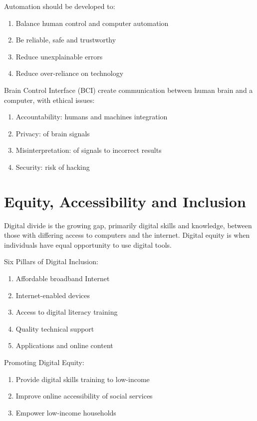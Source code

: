 \documentclass[12pt, a4paper]{article}
\begin{document}
\begin{multicols*}{3}
Automation should be developed to:
\begin{enumerate}[\roman*.]
  \item Balance human control and computer automation 
  \item Be reliable, safe and trustworthy
  \item Reduce unexplainable errors
  \item Reduce over-reliance on technology
\end{enumerate}

Brain Control Interface (BCI) create communication between human brain and a computer, with ethical issues:
\begin{enumerate}[\roman*.]
  \item Accountability: humans and machines integration
  \item Privacy: of brain signals
  \item Misinterpretation: of signals to incorrect results
  \item Security: risk of hacking
\end{enumerate}
\vspace{-0.5em}
\section{Equity, Accessibility and Inclusion}
Digital divide is the growing gap, primarily digital skills and knowledge, between those with differing access to computers and the internet. Digital equity is when individuals have equal opportunity to use digital tools.

Six Pillars of Digital Inclusion:
\begin{enumerate}[\roman*.]
  \item Affordable broadband Internet 
  \item Internet-enabled devices
  \item Access to digital literacy training
  \item Quality technical support 
  \item Applications and online content
\end{enumerate}

Promoting Digital Equity:
\begin{enumerate}[\roman*.]
  \item Provide digital skills training to low-income
  \item Improve online accessibility of social services
  \item Empower low-income households
\end{enumerate}


\end{multicols*}
\end{document}

